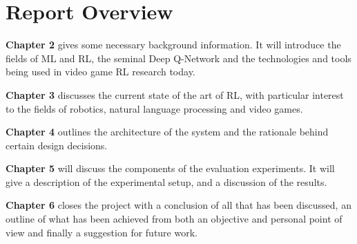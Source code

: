 \section{Report Overview}
\textbf{Chapter 2} gives some necessary background information. It will introduce the fields of ML and RL, the seminal Deep Q-Network and the technologies and tools being used in video game RL research today.

\textbf{Chapter 3} discusses the current state of the art of RL, with particular interest to the fields of robotics, natural language processing and video games.

\textbf{Chapter 4} outlines the architecture of the system and the rationale behind certain design decisions.

\textbf{Chapter 5} will discuss the components of the evaluation experiments. It will give a description of the experimental setup, and a discussion of the results.

\textbf{Chapter 6} closes the project with a conclusion of all that has been discussed, an outline of what has been achieved from both an objective and personal point of view and finally a suggestion for future work.

